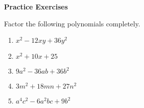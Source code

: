 \textbf{Practice Exercises}

\vspce

Factor the following polynomials completely. 

\begin{enumerate}

\item \hspce $x^{2} - 12xy + 36y^{2} $
\item \hspce $x^{2} + 10x + 25$
\item \hspce $9a^{2} - 36ab + 36b^{2}$
\item \hspce $3m^{2} + 18mn + 27n^{2}$
\item \hspce $a^{4}c^2 - 6a^{2}bc + 9b^{2}$

\end{enumerate}